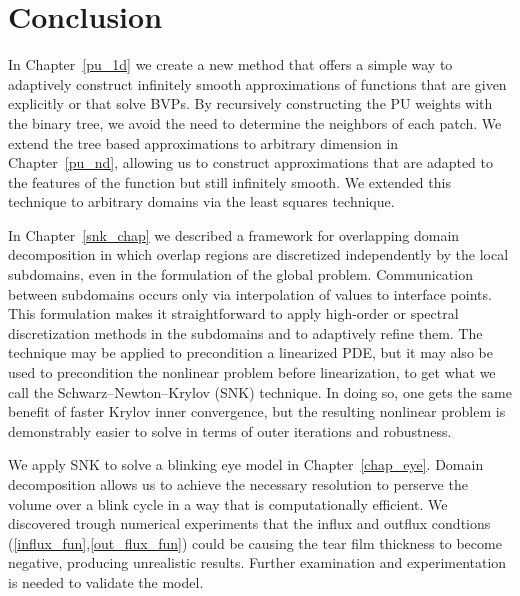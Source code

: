 \chapter{Conclusion}

In Chapter~\ref{pu_1d} we create a new method that offers a simple way to adaptively construct infinitely smooth approximations of functions that are given explicitly or that solve BVPs. By recursively constructing the PU weights with the binary tree, we avoid the need to determine the neighbors of each patch. We extend the tree based approximations to arbitrary dimension in Chapter~\ref{pu_nd}, allowing us to construct approximations that are adapted to the features of the function but still infinitely smooth. We extended this technique to arbitrary domains via the least squares technique. 

In Chapter~\ref{snk_chap} we described a framework for overlapping domain decomposition in which overlap regions are discretized independently by the local subdomains, even in the formulation of the global problem. Communication between subdomains occurs only via interpolation of values to interface points. This formulation makes it straightforward to apply high-order or spectral discretization methods in the subdomains and to adaptively refine them. The technique may be applied to precondition a linearized PDE, but it may also be used to precondition the nonlinear problem before linearization, to get what we call the Schwarz--Newton--Krylov (SNK) technique. In doing so, one gets the same benefit of faster Krylov inner convergence, but the resulting nonlinear problem is demonstrably easier to solve in terms of outer iterations and robustness. 

We apply SNK to solve a blinking eye model in Chapter~\ref{chap_eye}. Domain decomposition allows us to achieve the necessary resolution to perserve the volume over a blink cycle in a way that is computationally efficient. We discovered trough numerical experiments that the influx and outflux condtions (\ref{influx_fun},\ref{out_flux_fun}) could be causing the tear film thickness to become negative, producing unrealistic results. Further examination and experimentation is needed to validate the model.

